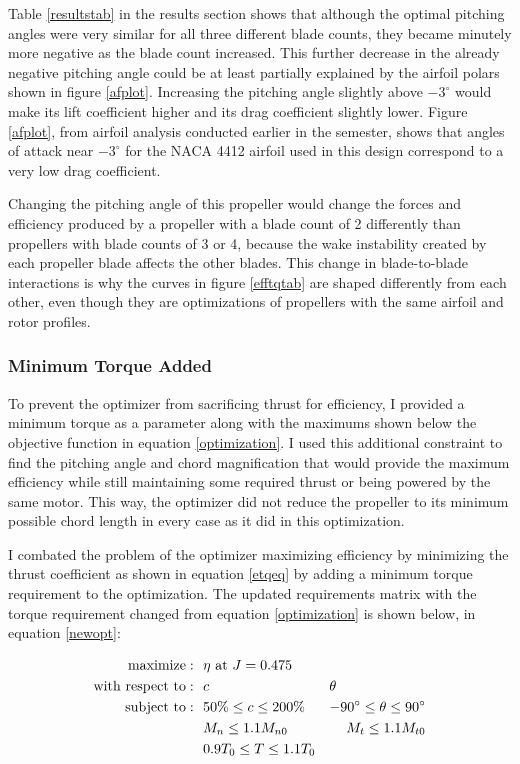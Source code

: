 \documentclass[journal ]{new-aiaa}
\begin{document}
Table \eqref{resultstab} in the results section shows that although the optimal pitching angles were very similar for all three different blade counts, they became minutely more negative as the blade count increased. This further decrease in the already negative pitching angle could be at least partially explained by the airfoil polars shown in figure \eqref{afplot}. Increasing the pitching angle slightly above $-3^{\circ}$ would make its lift coefficient higher and its drag coefficient slightly lower. Figure \eqref{afplot}, from airfoil analysis conducted earlier in the semester, shows that angles of attack near $-3^{\circ}$ for the NACA 4412 airfoil used in this design correspond to a very low drag coefficient.

Changing the pitching angle of this propeller would change the forces and efficiency produced by a propeller with a blade count of 2 differently than propellers with blade counts of 3 or 4, because the wake instability created by each propeller blade affects the other blades\cite{bceff}. This change in blade-to-blade interactions is why the curves in figure \eqref{efftqtab} are shaped differently from each other, even though they are optimizations of propellers with the same airfoil and rotor profiles.

\subsubsection{Minimum Torque Added}

To prevent the optimizer from sacrificing thrust for efficiency, I provided a minimum torque as a parameter along with the maximums shown below the objective function in equation \eqref{optimization}. I used this additional constraint to find the pitching angle and chord magnification that would provide the maximum efficiency while still maintaining some required thrust or being powered by the same motor. This way, the optimizer did not reduce the propeller to its minimum possible chord length in every case as it did in this optimization.

I combated the problem of the optimizer maximizing efficiency by minimizing the thrust coefficient as shown in equation \eqref{etqeq} by adding a minimum torque requirement to the optimization. The updated requirements matrix with the torque requirement changed from equation \eqref{optimization} is shown below, in equation \eqref{newopt}:

\begin{equation}
	\begin{aligned}
		\mathrm{maximize:}& ~~ \eta ~ \text{at} ~ J = 0.475 \\
		\mathrm{with~respect~to:}& ~~ c & \multicolumn{1}{l}{$\theta$} \\
		\mathrm{subject~to:}& ~~ 50\% \leq c \leq 200\% & -90^{\circ} \leq \theta \leq 90^{\circ} \\
		& ~~ M_{n} \leq 1.1 M_{n0} & M_{t} \leq 1.1 M_{t0} \\
		& ~~ 0.9 T_{0} \leq T \leq 1.1 T_{0} \\
	\end{aligned}
	\label{newopt}
\end{equation}
\end{document}
